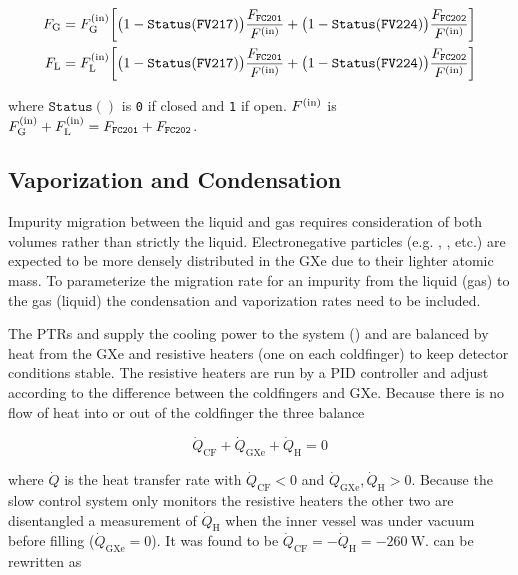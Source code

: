 \begin{subequations}
\begin{align}
F_{\mathrm{G}} &= F_{\mathrm{G}}^{(\mathrm{in})} \bigg[ \big(1 - \mathtt{Status(FV217)}\big) \frac{F_{\mathtt{FC201}}}{F^{(\mathrm{in})}} +
\big(1 - \mathtt{Status(FV224)}\big) \frac{F_{\mathtt{FC202}}}{F^{(\mathrm{in})}} \bigg]
\\
F_{\mathrm{L}} &= F_{\mathrm{L}}^{(\mathrm{in})} \bigg[ \big(1 - \mathtt{Status(FV217)}\big) \frac{F_{\mathtt{FC201}}}{F^{(\mathrm{in})}} +
\big(1 - \mathtt{Status(FV224)}\big) \frac{F_{\mathtt{FC202}}}{F^{(\mathrm{in})}} \bigg]
\end{align}
\end{subequations}

\noindent where $\mathtt{Status()}$ is \texttt{0} if closed and \texttt{1} if open.  $F^{(\mathrm{in})}$ is
$F_{\mathrm{G}}^{(\mathrm{in})} + F_{\mathrm{L}}^{(\mathrm{in})} = F_{\mathtt{FC201}} + F_{\mathtt{FC202}}$.



\subsection{Vaporization and Condensation}
\label{subsec:electron_lifetime_model_vap_and_cond}
Impurity migration between the liquid and gas requires consideration of both volumes rather than strictly the liquid.  Electronegative
particles (e.g. , , etc.) are expected to be more densely distributed in the GXe due to their lighter atomic mass.  To
parameterize the migration rate for an impurity from the liquid (gas) to the gas (liquid) the condensation and
vaporization rates need to be included.

The PTRs and  supply the cooling power to the system () and are balanced by heat from the GXe and
resistive heaters (one on each coldfinger) to keep detector conditions stable.  The resistive heaters are run by a PID controller and
adjust according to the difference
between the coldfingers and GXe.  Because there is no flow of heat into or out of the coldfinger the three balance

\begin{equation}
\dot{Q}_{\mathrm{CF}} + \dot{Q}_{\mathrm{GXe}} + \dot{Q}_{\mathrm{H}} = 0
\label{eq:electron_lifetime_model_vap_and_cond_heat_cons}
\end{equation}

\noindent where $\dot{Q}$ is the heat transfer rate with $\dot{Q}_{\mathrm{CF}} < 0$ and
$\dot{Q}_{\mathrm{GXe}}, \dot{Q}_{\mathrm{H}} > 0$.  Because the slow control system only monitors the resistive heaters the
other two are disentangled a measurement of $\dot{Q}_{\mathrm{H}}$ when the inner vessel was under vacuum before filling
($\dot{Q}_{\mathrm{GXe}} = 0$).  It was found
to be $\dot{Q}_{\mathrm{CF}} = -\dot{Q}_{\mathrm{H}} = -260\ \mathrm{W}$.   can
be rewritten as

